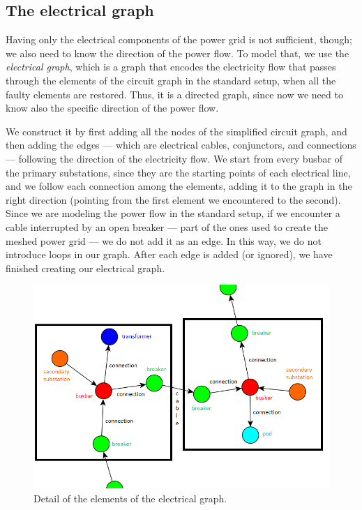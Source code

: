 \subsection{The electrical graph}

Having only the electrical components of the power grid is not sufficient, though; we also need to know the direction of the power flow. To model that, we use the \emph{electrical graph}, which is a graph that encodes the electricity flow that passes through the elements of the circuit graph in the standard setup, when all the faulty elements are restored. Thus, it is a directed graph, since now we need to know also the specific direction of the power flow.

We construct it by first adding all the nodes of the simplified circuit graph, and then adding the edges --- which are electrical cables, conjunctors, and connections --- following the direction of the electricity flow. We start from every busbar of the primary substations, since they are the starting points of each electrical line, and we follow each connection among the elements, adding it to the graph in the right direction (pointing from the first element we encountered to the second). Since we are modeling the power flow in the standard setup, if we encounter a cable interrupted by an open breaker --- part of the ones used to create the meshed power grid --- we do not add it as an edge.
In this way, we do not introduce loops in our graph. After each edge is added (or ignored), we have finished creating our electrical graph.

\begin{figure}[htbp]
    \centering
    \includegraphics[scale=0.6]{chapters/figures/Secondary_substations.PNG}
    \caption{Detail of the elements of the electrical graph.}
    \label{fig:secondary-substations}
\end{figure}


